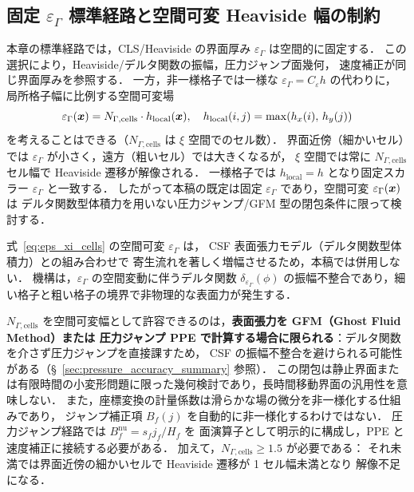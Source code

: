\subsection{固定 \texorpdfstring{$\varepsilon_\Gamma$}{epsilonGamma} 標準経路と空間可変 Heaviside 幅の制約}
\label{sec:eps_spatial_variable}

本章の標準経路では，CLS/Heaviside の界面厚み $\varepsilon_\Gamma$ は空間的に固定する．
この選択により，Heaviside/デルタ関数の振幅，圧力ジャンプ面幾何，
速度補正が同じ界面厚みを参照する．
一方，非一様格子では一様な $\varepsilon_\Gamma = C_\varepsilon h$ の代わりに，
局所格子幅に比例する空間可変場
\begin{equation}
  \varepsilon_\Gamma(\bm{x}) = N_{\Gamma,\text{cells}} \cdot h_{\mathrm{local}}(\bm{x}),
  \quad h_{\mathrm{local}}(i,j) = \max(h_x(i),\, h_y(j))
  \label{eq:eps_xi_cells}
\end{equation}
を考えることはできる（$N_{\Gamma,\text{cells}}$ は $\xi$ 空間でのセル数）．
界面近傍（細かいセル）では $\varepsilon_\Gamma$ が小さく，遠方（粗いセル）では大きくなるが，
$\xi$ 空間では常に $N_{\Gamma,\text{cells}}$ セル幅で Heaviside 遷移が解像される．
一様格子では $h_{\mathrm{local}} = h$ となり固定スカラー $\varepsilon_\Gamma$ と一致する．
したがって本稿の既定は固定 $\varepsilon_\Gamma$ であり，空間可変 $\varepsilon_\Gamma(\bx)$ は
デルタ関数型体積力を用いない圧力ジャンプ/GFM 型の閉包条件に限って検討する．

\begin{tcolorbox}[warnbox, title={空間可変 $\varepsilon_\Gamma(\bx)$ と CSF 表面張力の非互換性}]
\label{box:eps_xi_csf_warning}
式~\eqref{eq:eps_xi_cells} の空間可変 $\varepsilon_\Gamma$ は，
CSF 表面張力モデル（デルタ関数型体積力）との組み合わせで
寄生流れを著しく増幅させるため，本稿では併用しない．
機構は，$\varepsilon_\Gamma$ の空間変動に伴うデルタ関数 $\delta_{\varepsilon_\Gamma}(\phi)$
の振幅不整合であり，細い格子と粗い格子の境界で非物理的な表面力が発生する．

$N_{\Gamma,\text{cells}}$ を空間可変幅として許容できるのは，\textbf{表面張力を GFM（Ghost Fluid Method）または
圧力ジャンプ PPE で計算する場合に限られる}：デルタ関数を介さず圧力ジャンプを直接課すため，
CSF の振幅不整合を避けられる可能性がある（§~\ref{sec:pressure_accuracy_summary} 参照）．
この閉包は静止界面または有限時間の小変形問題に限った幾何検討であり，長時間移動界面の汎用性を意味しない．
また，座標変換の計量係数は滑らかな場の微分を非一様化する仕組みであり，
ジャンプ補正項 $B_f(j)$ を自動的に非一様化するわけではない．
圧力ジャンプ経路では $B_f^{\mathrm{nu}}=s_fj_f/H_f$ を
面演算子として明示的に構成し，PPE と速度補正に接続する必要がある．
加えて，$N_{\Gamma,\text{cells}} \ge 1.5$ が必要である：
それ未満では界面近傍の細かいセルで Heaviside 遷移が 1 セル幅未満となり
解像不足になる．
\end{tcolorbox}
